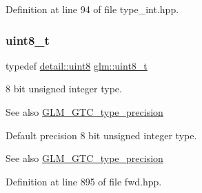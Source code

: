 Definition at line 94 of file type\+\_\+int.\+hpp.

\mbox{\label{group__gtc__type__precision_ga93adf6dd9803408f3e3aaf9dedda352b}} 
\subsubsection{\texorpdfstring{uint8\+\_\+t}{uint8\_t}}
{\footnotesize\ttfamily typedef \hyperlink{namespaceglm_1_1detail_aef2588f97d090cc19fbbe0c74fe17c8f}{detail\+::uint8} \hyperlink{group__gtc__type__precision_ga93adf6dd9803408f3e3aaf9dedda352b}{glm\+::uint8\+\_\+t}}

8 bit unsigned integer type. \begin{DoxySeeAlso}{See also}
\hyperlink{group__gtc__type__precision}{G\+L\+M\+\_\+\+G\+T\+C\+\_\+type\+\_\+precision}
\end{DoxySeeAlso}
Default precision 8 bit unsigned integer type. \begin{DoxySeeAlso}{See also}
\hyperlink{group__gtc__type__precision}{G\+L\+M\+\_\+\+G\+T\+C\+\_\+type\+\_\+precision} 
\end{DoxySeeAlso}


Definition at line 895 of file fwd.\+hpp.

